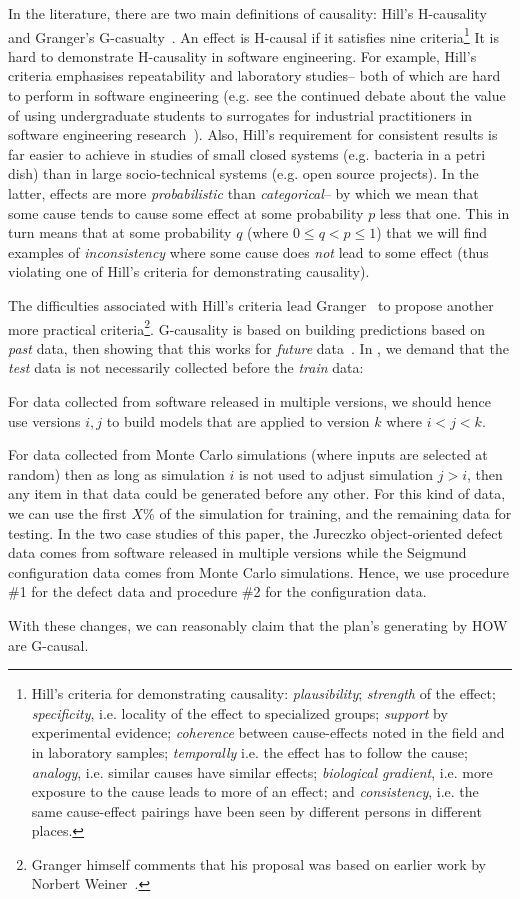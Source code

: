 In the literature, there are two main definitions of causality: Hill's H-causality~\cite{Hill1965}
and Granger's G-casualty~\cite{granger80}. 
An effect
is H-causal if it satisfies nine criteria\footnote{Hill's criteria for
demonstrating causality:
{\em  plausibility};
{\em strength} of the effect;
{\em 
specificity}, i.e. locality of the effect
to specialized groups;
{\em
support} by experimental evidence;
{\em 
coherence} between cause-effects noted
in the field and in laboratory samples;
{\em
temporally} i.e. the effect has to follow the cause;
{\em 
analogy}, i.e.  similar causes have similar effects;
{\em
biological gradient}, i.e.  more exposure to the cause leads to more of an
effect; and
{\em
consistency}, i.e.  the same cause-effect pairings have been seen by different persons
in different places.}
It is hard to demonstrate H-causality in software engineering.
For example, Hill's criteria emphasises repeatability and laboratory studies-- both of which are
hard to perform in software engineering (e.g. see the continued debate about
the value of using undergraduate students to surrogates for industrial
practitioners in software engineering research~\cite{Carver2003}). Also, Hill's requirement
for consistent results is far easier to achieve in studies of small closed systems (e.g. bacteria in a petri dish)
than in large socio-technical systems (e.g. open source projects). In the latter,
effects are more {\em probabilistic} than {\em categorical}-- by which we mean that 
some cause tends to cause some effect at some probability $p$ less that one.
This in turn means that at some probability $q$ (where $0 \le q < p \le 1$)
that we will find examples of {\em inconsistency} where some cause does {\em not} lead
to some effect (thus violating one of Hill's criteria for demonstrating causality).

The  difficulties associated with Hill's criteria lead Granger~\cite{granger80}
to propose another more practical criteria\footnote{Granger  himself comments that
his proposal was based on earlier work by Norbert Weiner~\cite{Seth2007}.}.
\mbox{G-causality} is based on building predictions based on {\em past} data,
then showing that this works for {\em future} data~\cite{granger80}. 
 In  , we demand that the {\em test}
data is not necessarily collected before the {\em train} data:
\bi
\item[\#1:] For data collected from software released in multiple versions, we should hence use  versions  $i,j$ to build models that are applied to version  $k$ where $i<j<k$.
\item[\#2:] For data collected from Monte Carlo simulations (where inputs are selected at random)
then as long as simulation $i$ is not used to adjust simulation $j> i$, then any item in that
data could be generated before any other. For this kind of data, we  can use the first $X\%$
of the simulation for training, and the remaining data for testing.
\ei
In the two case studies of this paper, the Jureczko object-oriented defect data comes from software
released in multiple versions while the Seigmund configuration data comes from Monte Carlo simulations.
Hence, we use procedure \#1 for the defect data and procedure \#2 for the configuration data.

With these changes,
we can reasonably claim that the plan's generating by HOW are G-causal.